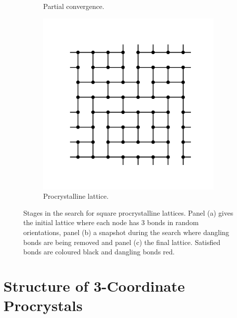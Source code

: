 \begin{figure}[bt]
\begin{subfigure}[b]{0.3\textwidth}
         \caption{Partial convergence.}
         \label{fig:promcb}
     \end{subfigure}
     \hfill
     \begin{subfigure}[b]{0.3\textwidth}
         \centering
         \includegraphics[width=\textwidth]{./figures/procrystals/pro_mc_4.pdf}
         \caption{Procrystalline lattice.}
         \label{fig:promcc}
     \end{subfigure}
     \hfill
     
     \caption{Stages in the \mc{} search for square procrystalline lattices. Panel (a) gives the initial lattice where each node has 3 bonds in random orientations, panel (b) a snapshot during the search where dangling bonds are being removed and panel (c) the final lattice. Satisfied bonds are coloured black and dangling bonds red.}
     \label{fig:promc}
\end{figure}

\section{Structure of 3\--Coordinate Procrystals}
\label{s:pro3}

